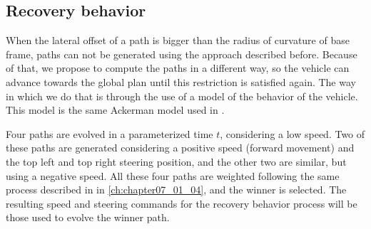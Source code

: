 \subsection{Recovery behavior}\label{ch:chapter07_01_05}

When the lateral offset of a path is bigger than the radius of curvature of base frame, paths can not be generated using the approach described before. Because of that, we propose to compute the paths in a different way, so the vehicle can advance towards the global plan until this restriction is satisfied again. The way in which we do that is through the use of a model of the behavior of the vehicle. This model is the same Ackerman model used in \cite{espelosin2013path}.

Four paths are evolved in a parameterized time $t$, considering a low speed. Two of these paths are generated considering a positive speed (forward movement) and the top left and top right steering position, and the other two are similar, but using a negative speed. All these four paths are weighted following the same process described in in \ref{ch:chapter07_01_04}, and the winner is selected. The resulting speed and steering commands for the recovery behavior process will be those used to evolve the winner path.

